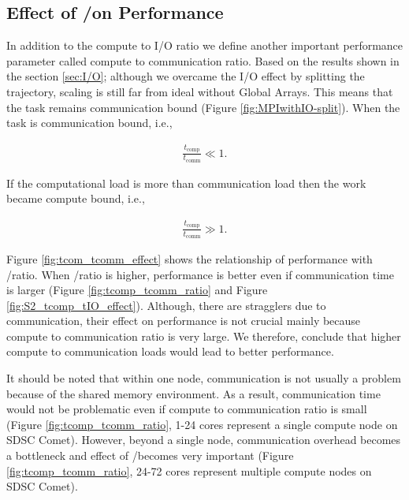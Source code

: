 \subsection{Effect of \tcomp/\tcomm on Performance}
In addition to the compute to I/O ratio we define another important performance parameter called compute to communication ratio.
Based on the results shown in the section \ref{sec:I/O}; although we overcame the I/O effect by splitting the trajectory, scaling is still far from ideal without Global Arrays.
This means that the task remains communication bound (Figure \ref{fig:MPIwithIO-split}). 
When the task is communication bound, i.e.,

\begin{gather*}
  \frac{t_{\text{comp}}}{t_{\text{comm}}} \ll 1.
\end{gather*}

If the computational load is more than communication load then the work became compute bound, i.e.,

\begin{gather*}
  \frac{t_{\text{comp}}}{t_{\text{comm}}} \gg 1.
\end{gather*}

Figure \ref{fig:tcom_tcomm_effect} shows the relationship of performance with \tcomp/\tcomm ratio.
When \tcomp/\tcomm ratio is higher, performance is better even if communication time is larger (Figure \ref{fig:tcomp_tcomm_ratio} and Figure \ref{fig:S2_tcomp_tIO_effect}).
Although, there are stragglers due to communication, their effect on performance is not crucial mainly because compute to communication ratio is very large. 
We therefore, conclude that higher compute to communication loads would lead to better performance. 

It should be noted that within one node, communication is not usually a problem because of the shared memory environment. 
As a result, communication time would not be problematic even if compute to communication ratio is small (Figure \ref{fig:tcomp_tcomm_ratio}, 1-24 cores represent a single compute node on SDSC Comet).
However, beyond a single node, communication overhead becomes a bottleneck and effect of \tcomp/\tcomm becomes very important (Figure \ref{fig:tcomp_tcomm_ratio}, 24-72 cores represent multiple compute nodes on SDSC Comet).

